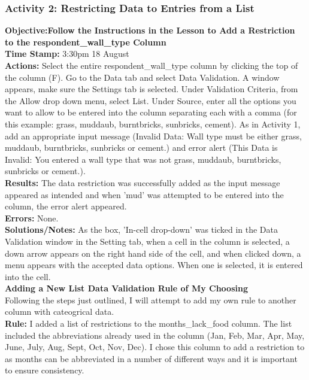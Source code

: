 \documentclass{article}
\begin{document}
\begin{FlushLeft}
\subsubsection*{Activity 2: Restricting Data to Entries from a List}
\textbf{Objective:Follow the Instructions in the Lesson to Add a Restriction to the respondent\_wall\_type Column}\\ 
\textbf{Time Stamp:} 3:30pm 18 August\\
\textbf{Actions:} Select the entire respondent\_wall\_type column by clicking the top of the column (F). Go to the Data tab and select Data Validation. A window appears, make sure the Settings tab is selected. Under Validation Criteria, from the Allow drop down menu, select List. Under Source, enter all the options you want to allow to be entered into the column separating each with a comma (for this example: grass, muddaub, burntbricks, sunbricks, cement). As in Activity 1, add an appropriate input message (Invalid Data: Wall type must be either grass, muddaub, burntbricks, sunbricks or cement.) and error alert (This Data is Invalid: You entered a wall type that was not grass, muddaub, burntbricks, sunbricks or cement.).\\
\textbf{Results:} The data restriction was successfully added as the input message appeared as intended and when 'mud' was attempted to be entered into the column, the error alert appeared.\\
\textbf{Errors:} None.\\
\textbf{Solutions/Notes:} As the box, 'In-cell drop-down' was ticked in the Data Validation window in the Setting tab, when a cell in the column is selected, a down arrow appears on the right hand side of the cell, and when clicked down, a menu appears with the accepted data options. When one is selected, it is entered into the cell.\\
\vspace{5mm}
\textbf{Adding a New List Data Validation Rule of My Choosing}\\
Following the steps just outlined, I will attempt to add my own rule to another column with cateogrical data.\\
\textbf{Rule:} I added a list of restrictions to the months\_lack\_food column. The list included the abbreviations already used in the column (Jan, Feb, Mar, Apr, May, June, July, Aug, Sept, Oct, Nov, Dec). I chose this column to add a restriction to as months can be abbreviated in a number of different ways and it is important to ensure consistency.\\

\end{FlushLeft}
\end{document}
